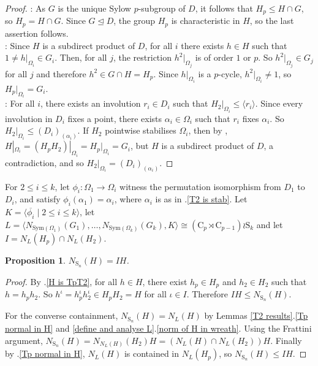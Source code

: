 \documentclass[11pt,a4paper]{article}
\newtheorem{proposition}[theorem]{Proposition}
\theoremstyle{definition}
\theoremstyle{remark}
\newcommand{\Sym}[0]{\mathrm{Sym}}
\newcommand{\Sy}{\mathrm{S}}
\newcommand{\Cy}{\mathrm{C}}
\begin{document}
\begin{proof}
: As $G$ is the unique Sylow $p$-subgroup of $D$, it follows that $H_p \leq H \cap G$, so $H_p = H \cap G$. Since $G \trianglelefteq D$, the group $H_p$ is characteristic in $H$, so the last assertion follows. \\ 
: 
Since $H$ is a subdirect product of $D$, for all $i$ there exists $h \in H$ such that $1 \neq h|_{\Omega_i} \in G_i$. 
Then, for all $j$, the restriction $h^2|_{\Omega_j}$ is of order $1$ or $p$.
So $h^2|_{\Omega_j} \in G_j$ for all $j$ and therefore $h^2 \in G \cap H = H_p$. 
Since $h|_{\Omega_i}$ is a $p$-cycle, $h^2|_{\Omega_i} \neq 1$, so $H_p|_{\Omega_i} = G_i$.  \\
: 
For all $i$, there exists an involution $r_i \in D_i$ such that $H_2|_{\Omega_i} \leq \langle r_i \rangle$. 
Since every involution in $D_i$ fixes a point, there exists $\alpha_i \in \Omega_i$ such that $r_i$ fixes $\alpha_i$.  
So $H_2|_{\Omega_i} \leq (D_i)_{(\alpha_i)}$.
If $H_2$ pointwise stabilises $\Omega_i$, then by , 
$H|_{\Omega_i} = (H_p H_2)|_{\Omega_i} =  H_p|_{\Omega_i} = G_i$,
but $H$ is a subdirect product of $D$, a contradiction, and so $H_2|_{\Omega_i} = (D_i)_{(\alpha_i)}$. %
\end{proof}



For $2 \leq i \leq k$, let $\phi_i : \Omega_1 \rightarrow \Omega_i$ witness the permutation isomorphism from $D_1$ to $D_i$, and satisfy $\phi_i(\alpha_1)= \alpha_i$, where $\alpha_i$ is as in .\ref{T2 is stab}. 
Let $K = \langle \overline{\phi_i} \mid 2 \leq i \leq k \rangle$, let $L = \langle N_{\Sym(\Omega_1)}(G_1) ,\ldots, N_{\Sym(\Omega_k)}(G_k), K \rangle \cong (\Cy_p \rtimes \Cy_{p-1}) \wr \Sy_k$ and let $I = N_L(H_p) \cap N_L(H_2)$.

\begin{proposition} \label{frattini on subdir od D2pk}
$N_{\Sy_n}(H) = IH$.
\end{proposition}

\begin{proof}
By .\ref{H is TpT2}, for all $h \in H$, there exist $h_p \in H_p$ and $h_2 \in H_2$ such that $h=h_ph_2$. 
So $h^\iota = h_p^{\iota} h_2^{\iota} \in H_p H_2 = H$ for all $\iota \in I$. 
Therefore $IH \leq N_{\Sy_n}(H)$. 

For the converse containment, $N_{\Sy_n}(H) = N_L(H)$ by Lemmas \ref{T2 results}.\ref{Tp normal in H} and \ref{define and analyse L}.\ref{norm of H in wreath}. Using the Frattini argument, $N_{\Sy_n}(H)= N_{N_L(H)}(H_2)H = (N_L(H) \cap N_L(H_2))H$.  
Finally by .\ref{Tp normal in H}, $N_L(H)$ is contained in $N_L(H_p)$, so $N_{\Sy_n}(H) \leq IH$. 
\end{proof}
\end{document}
